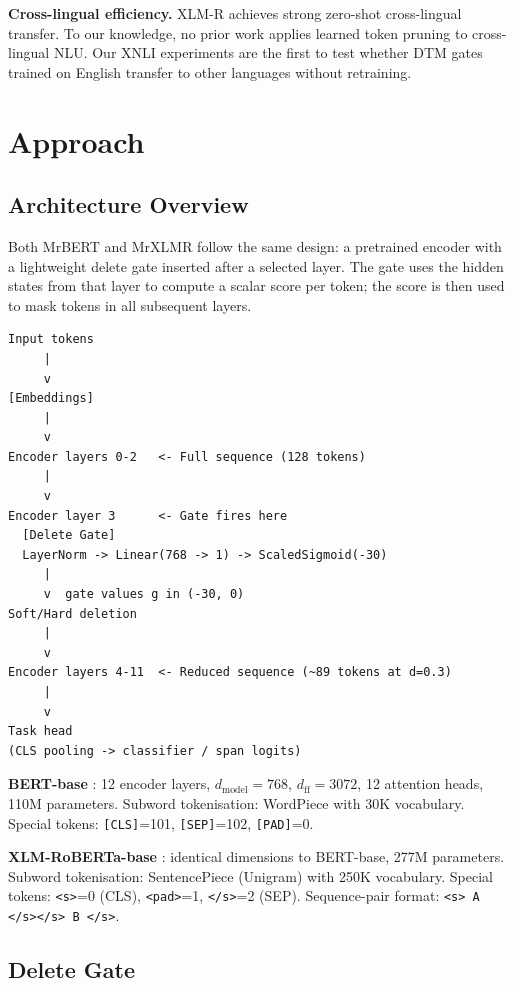 \documentclass[11pt,a4paper]{article}
\begin{document}
\textbf{Cross-lingual efficiency.} XLM-R \citep{conneau2020xlmr} achieves strong zero-shot cross-lingual transfer. To our knowledge, no prior work applies learned token pruning to cross-lingual NLU. Our XNLI experiments are the first to test whether DTM gates trained on English transfer to other languages without retraining.


\section{Approach}
\label{sec:approach}

\subsection{Architecture Overview}
\label{sec:arch-overview}

Both MrBERT and MrXLMR follow the same design: a pretrained encoder with a lightweight delete gate inserted after a selected layer. The gate uses the hidden states from that layer to compute a scalar score per token; the score is then used to mask tokens in all subsequent layers.

\begin{lstlisting}
Input tokens
     |
     v
[Embeddings]
     |
     v
Encoder layers 0-2   <- Full sequence (128 tokens)
     |
     v
Encoder layer 3      <- Gate fires here
  [Delete Gate]
  LayerNorm -> Linear(768 -> 1) -> ScaledSigmoid(-30)
     |
     v  gate values g in (-30, 0)
Soft/Hard deletion
     |
     v
Encoder layers 4-11  <- Reduced sequence (~89 tokens at d=0.3)
     |
     v
Task head
(CLS pooling -> classifier / span logits)
\end{lstlisting}

\textbf{BERT-base} \citep{devlin2019bert}: 12 encoder layers, $d_{\text{model}} = 768$, $d_{\text{ff}} = 3072$, 12 attention heads, 110M parameters. Subword tokenisation: WordPiece with 30K vocabulary. Special tokens: \texttt{[CLS]}=101, \texttt{[SEP]}=102, \texttt{[PAD]}=0.

\textbf{XLM-RoBERTa-base} \citep{conneau2020xlmr}: identical dimensions to BERT-base, 277M parameters. Subword tokenisation: SentencePiece (Unigram) with 250K vocabulary. Special tokens: \texttt{<s>}=0 (CLS), \texttt{<pad>}=1, \texttt{</s>}=2 (SEP). Sequence-pair format: \texttt{<s> A </s></s> B </s>}.


\subsection{Delete Gate}
\label{sec:delete-gate}
\end{document}
